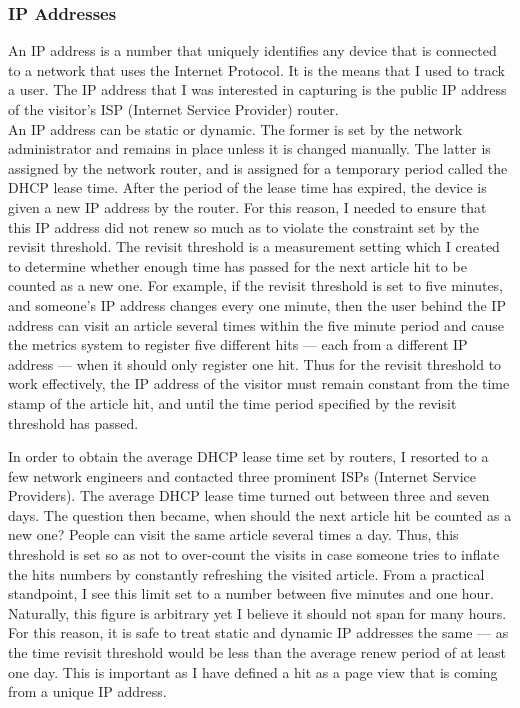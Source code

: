 \documentclass[12pt]{article}
\begin{document}
\subsubsection{IP Addresses}
An IP address is a number that uniquely identifies any device that is connected to a network that uses the Internet Protocol. It is the means that I used to track a user. The IP address that I was interested in capturing is the public IP address of the visitor's ISP (Internet Service Provider) router. \\
An IP address can be static or dynamic. The former is set by the network administrator and remains in place unless it is changed manually. The latter is assigned by the network router, and is assigned for a temporary period called the DHCP lease time. After the period of the lease time has expired, the device is given a new IP address by the router. For this reason, I needed to ensure that this IP address did not renew so much as to violate the constraint set by the revisit threshold. The revisit threshold is a measurement setting which I created to determine whether enough time has passed for the next article hit to be counted as a new one. For example, if the revisit threshold is set to five minutes, and someone's IP address changes every one minute, then the user behind the IP address can visit an article several times within the five minute period and cause the metrics system to register five different hits --- each from a different IP address --- when it should only register one hit. Thus for the revisit threshold to work effectively, the IP address of the visitor must remain constant from the time stamp of the article hit, and until the time period specified by the revisit threshold has passed. 

In order to obtain the average DHCP lease time set by routers, I resorted to a few network engineers and contacted three prominent ISPs (Internet Service Providers). The average DHCP lease time turned out between three and seven days. The question then became, when should the next article hit be counted as a new one? People can visit the same article several times a day. Thus, this threshold is set so as not to over-count the visits in case someone tries to inflate the hits numbers by constantly refreshing the visited article. From a practical standpoint, I see this limit set to a number between five minutes and one hour. Naturally, this figure is arbitrary yet I believe it should not span for many hours. For this reason, it is safe to treat static and dynamic IP addresses the same --- as the time revisit threshold would be less than the average renew period of at least one day. This is important as I have defined a hit as a page view that is coming from a unique IP address.
\end{document}
